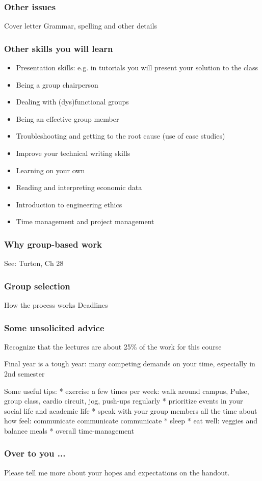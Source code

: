 \begin{frame}\frametitle{Other issues}
	Cover letter
	Grammar, spelling and other details
\end{frame}

\begin{frame}\frametitle{Other skills you will learn}
	\begin{itemize}
		\item	Presentation skills: e.g. in tutorials you will present your solution to the class
		\item	Being a group chairperson
		\item	Dealing with (dys)functional groups
		\item	Being an effective group member
		\item	Troubleshooting and getting to the root cause (use of case studies)
		\item	Improve your technical writing skills
		\item	Learning on your own
		\item	Reading and interpreting economic data
		\item	Introduction to engineering ethics
		\item	Time management and project management
	\end{itemize}
	
\end{frame}

\begin{frame}\frametitle{Why group-based work}
	See: Turton, Ch 28
\end{frame}

\begin{frame}\frametitle{Group selection}
	How the process works
	Deadlines
\end{frame}

\begin{frame}\frametitle{Some unsolicited advice}
	Recognize that the lectures are about 25\% of the work for this course

	Final year is a tough year: many competing demands on your time, especially in 2nd semester

	Some useful tips:
	* exercise a few times per week: walk around campus, Pulse, group class, cardio circuit, jog, push-ups regularly
	* prioritize events in your social life and academic life
	* speak with your group members all the time about how feel: communicate communicate communicate
	* sleep
	* eat well: veggies and balance meals
	* overall time-management
\end{frame}

\begin{frame}\frametitle{Over to you ...}
	Please tell me more about your hopes and expectations on the handout.
\end{frame}